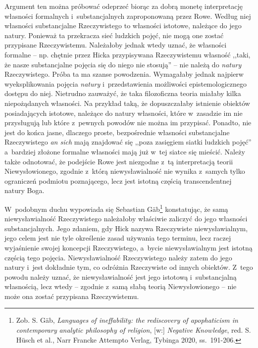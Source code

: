Argument ten można próbować odeprzeć biorąc za dobrą monetę interpretację własności formalnych i~substancjalnych zaproponowaną przez Rowe. Według niej własności substancjalne Rzeczywistego to własności istotowe, należące do jego natury. Ponieważ ta przekracza sieć ludzkich pojęć, nie mogą one zostać przypisane Rzeczywistemu. Należałoby jednak wtedy uznać, że własności formalne -- np. chętnie przez Hicka przypisywana Rzeczywistemu własność ,,taki, że nasze substancjalne pojęcia się do niego nie stosują'' -- nie należą do \textit{natury} Rzeczywistego. Próba ta ma szanse powodzenia. Wymagałaby jednak najpierw wyeksplikowania pojęcia \textit{natury} i~przedstawienia możliwości epistemologicznego dostępu do niej. Nietrudno zauważyć, że taka filozoficzna teoria miałaby kilka niepożądanych własności. Na przykład taką, że dopuszczałaby istnienie obiektów posiadających istotowe, należące do natury własności, które w~zasadzie im nie przysługują lub które z~pewnych powodów nie można im przypisać. Ponadto, nie jest do końca jasne, dlaczego proste, bezpośrednie własności substancjalne Rzeczywistego \textit{an sich} mają znajdować się ,,poza zasięgiem siatki ludzkich pojęć'' a~bardziej złożone formalne własności mają już w~tej siatce się mieścić. Należy także odnotować, że podejście Rowe jest niezgodne z~tą interpretacją teorii Niewysłowionego, zgodnie z~którą niewysławialność nie wynika z~samych tylko ograniczeń podmiotu poznającego, lecz jest istotną częścią transcendentnej natury Boga.

W~podobnym duchu wypowiada się Sebastian Gäb\footnote{Zob. S. Gäb, \textit{Languages of ineffability: the rediscovery of apophaticism in contemporary} \textit{analytic philosophy of religion}, [w:] \textit{Negative Knowledge}, red. S. Hüsch et al., Narr Francke Attempto Verlag, Tybinga 2020, ss.~191-206.} konstatując, że samą niewysławialność Rzeczywistego należałoby właściwie zaliczyć do jego własności substancjalnych. Jego zdaniem, gdy Hick nazywa Rzeczywiste niewysławialnym, jego celem jest nie tyle określenie zasad używania tego terminu, lecz raczej wyjaśnienie swojej koncepcji Rzeczywistego, a~bycie niewysławialnym jest istotną częścią tego pojęcia. Niewysławialność Rzeczywistego należy zatem do jego natury i~jest dokładnie tym, co odróżnia Rzeczywiste od innych obiektów. Z~tego powodu należy uznać, że niewysławialność jest jego istotową i~substancjalną własnością, lecz wtedy -- zgodnie z~samą słabą teorią Niewysłowionego -- nie może ona zostać przypisana Rzeczywistemu.


